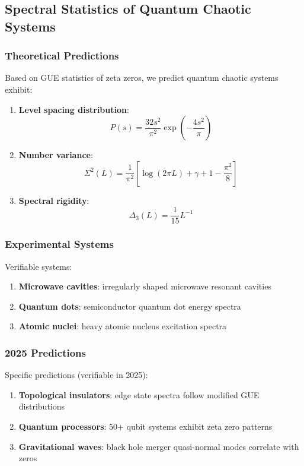 \documentclass[11pt]{article}
\theoremstyle{plain}
\theoremstyle{definition}
\theoremstyle{remark}
\begin{document}
\subsection{Spectral Statistics of Quantum Chaotic Systems}

\subsubsection{Theoretical Predictions}

Based on GUE statistics of zeta zeros, we predict quantum chaotic systems exhibit:

\begin{enumerate}
\item \textbf{Level spacing distribution}:
   $$P(s) = \frac{32s^2}{\pi^2} \exp\left(-\frac{4s^2}{\pi}\right)$$

\item \textbf{Number variance}:
   $$\Sigma^2(L) = \frac{1}{\pi^2} \left[\log(2\pi L) + \gamma + 1 - \frac{\pi^2}{8}\right]$$

\item \textbf{Spectral rigidity}:
   $$\Delta_3(L) = \frac{1}{15}L^{-1}$$
\end{enumerate}

\subsubsection{Experimental Systems}

Verifiable systems:
\begin{enumerate}
\item \textbf{Microwave cavities}: irregularly shaped microwave resonant cavities
\item \textbf{Quantum dots}: semiconductor quantum dot energy spectra
\item \textbf{Atomic nuclei}: heavy atomic nucleus excitation spectra
\end{enumerate}

\subsubsection{2025 Predictions}

Specific predictions (verifiable in 2025):
\begin{enumerate}
\item \textbf{Topological insulators}: edge state spectra follow modified GUE distributions
\item \textbf{Quantum processors}: 50+ qubit systems exhibit zeta zero patterns
\item \textbf{Gravitational waves}: black hole merger quasi-normal modes correlate with zeros
\end{enumerate}
\end{document}
